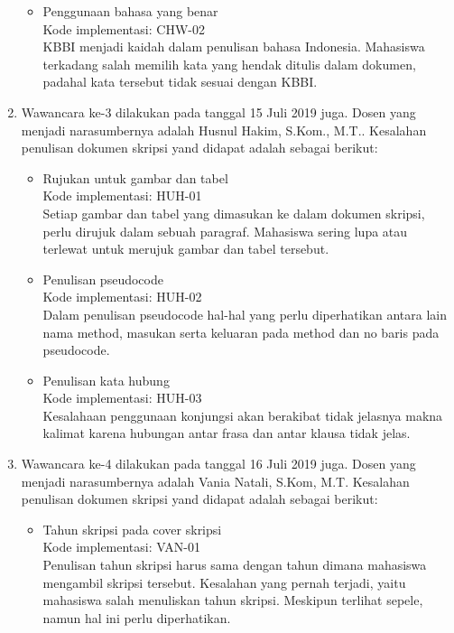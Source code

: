 \begin{enumerate}
\begin{itemize}
			\item Penggunaan bahasa yang benar \\
			Kode implementasi: CHW-02 \\
			KBBI menjadi kaidah dalam penulisan bahasa Indonesia. Mahasiswa terkadang salah memilih kata yang hendak ditulis dalam dokumen, padahal kata tersebut tidak sesuai dengan KBBI.	
			
		\end{itemize}
		
	\item Wawancara ke-3 dilakukan pada tanggal 15 Juli 2019 juga. Dosen yang menjadi narasumbernya adalah Husnul Hakim, S.Kom., M.T.. Kesalahan penulisan dokumen skripsi yand didapat adalah sebagai berikut:
	
		\begin{itemize}
			\item Rujukan untuk gambar dan tabel \\	
			Kode implementasi: HUH-01 \\
			Setiap gambar dan tabel yang dimasukan ke dalam dokumen skripsi, perlu dirujuk dalam sebuah paragraf. Mahasiswa sering lupa atau terlewat untuk merujuk gambar dan tabel tersebut.			
			
			\item Penulisan pseudocode \\
			Kode implementasi: HUH-02 \\
			Dalam penulisan pseudocode hal-hal yang perlu diperhatikan antara lain nama method, masukan serta keluaran pada method dan no baris pada pseudocode.			
			
			\item Penulisan kata hubung \\
			Kode implementasi: HUH-03 \\
			Kesalahaan penggunaan konjungsi akan berakibat tidak jelasnya makna kalimat karena hubungan antar frasa dan antar klausa tidak jelas.
			
		\end{itemize}
		
	\item Wawancara ke-4 dilakukan pada tanggal 16 Juli 2019 juga. Dosen yang menjadi narasumbernya adalah Vania Natali, S.Kom, M.T. Kesalahan penulisan dokumen skripsi yand didapat adalah sebagai berikut:
	
		\begin{itemize}
			\item Tahun skripsi pada cover skripsi \\
			Kode implementasi: VAN-01 \\
			Penulisan tahun skripsi harus sama dengan tahun dimana mahasiswa mengambil skripsi tersebut. Kesalahan yang pernah terjadi, yaitu mahasiswa salah menuliskan tahun skripsi. Meskipun terlihat sepele, namun hal ini perlu diperhatikan.			
			

\end{itemize}
\end{enumerate}
